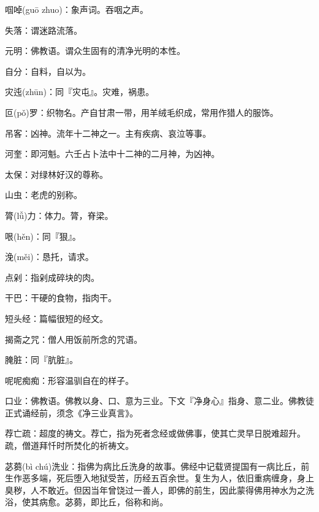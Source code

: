 \startbuffer[544]
啯啅(guō zhuo)：象声词。吞咽之声。
\stopbuffer


\startbuffer[545]
失落：谓迷路流落。
\stopbuffer


\startbuffer[546]
元明：佛教语。谓众生固有的清净光明的本性。
\stopbuffer


\startbuffer[547]
自分：自料，自以为。
\stopbuffer

\startbuffer[548]
灾迍(zhūn)：同『灾屯』。灾难，祸患。
\stopbuffer


\startbuffer[549]
叵(pǒ)罗：织物名。产自甘肃一带，用羊绒毛织成，常用作猎人的服饰。
\stopbuffer


\startbuffer[550]
吊客：凶神。流年十二神之一。主有疾病、哀泣等事。
\stopbuffer


\startbuffer[551]
河奎：即河魁。六壬占卜法中十二神的二月神，为凶神。
\stopbuffer


\startbuffer[552]
太保：对绿林好汉的尊称。
\stopbuffer


\startbuffer[553]
山虫：老虎的别称。
\stopbuffer


\startbuffer[554]
膂(lǚ)力：体力。膂，脊梁。
\stopbuffer


\startbuffer[555]
哏(hěn)：同『狠』。
\stopbuffer


\startbuffer[556]
浼(měi)：恳托，请求。
\stopbuffer


\startbuffer[557]
点剁：指剁成碎块的肉。
\stopbuffer


\startbuffer[558]
干巴：干硬的食物，指肉干。
\stopbuffer


\startbuffer[559]
短头经：篇幅很短的经文。
\stopbuffer


\startbuffer[560]
揭斋之咒：僧人用饭前所念的咒语。
\stopbuffer


\startbuffer[561]
腌脏：同『肮脏』。
\stopbuffer


\startbuffer[562]
呢呢痴痴：形容温驯自在的样子。
\stopbuffer


\startbuffer[563]
口业：佛教语。佛教以身、口、意为三业。下文『净身心』指身、意二业。佛教徒正式诵经前，须念《净三业真言》。
\stopbuffer


\startbuffer[564]
荐亡疏：超度的祷文。荐亡，指为死者念经或做佛事，使其亡灵早日脱难超升。疏，僧道拜忏时所焚化的祈祷文。
\stopbuffer


\startbuffer[565]
苾蒭(bì chú)洗业：指佛为病比丘洗身的故事。佛经中记载贤提国有一病比丘，前生作恶多端，死后堕入地狱受苦，历经五百余世。复生为人，依旧重病缠身，身上臭秽，人不敢近。但因当年曾饶过一善人，即佛的前生，因此蒙得佛用神水为之洗浴，使其病愈。苾蒭，即比丘，俗称和尚。
\stopbuffer


